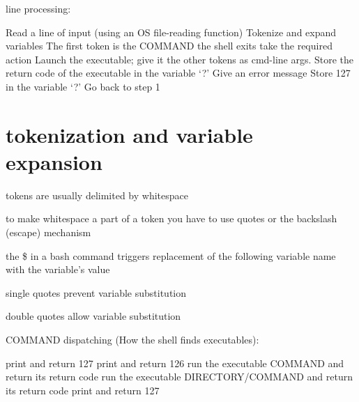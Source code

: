 \documentclass[landscape]{foils}
\begin{document}
\myNewSlide
\normalsize
{} line processing:
\begin{algorithmic}[1]
	\STATE Read a line of input (using an OS file-reading function)
	\STATE Tokenize and expand variables
	\STATE The first token is the COMMAND
	\STATE the  shell exits
	\STATE take the required action
	\ELSE 
		\STATE Launch the executable; give it the other tokens as cmd-line args.
		\STATE Store the return code of the executable in the variable `?'
	\ELSE
		\STATE Give an error message
		\STATE Store 127 in the variable `?'
	\ENDIF
	\ENDIF
	\STATE Go back to step 1
\end{algorithmic}

\myNewSlide
\section*{ tokenization and variable expansion}
\begin{compactenum}
	\item tokens are usually delimited by whitespace
	\item to make whitespace a part of a token you have to use quotes or the backslash (escape) mechanism
	\item the \$ in a bash command triggers replacement of the following variable name with the variable's value
	\item single quotes prevent variable substitution
	\item double quotes allow variable substitution
\end{compactenum}


\myNewSlide

 COMMAND  dispatching (How the shell finds executables):
\begin{algorithmic}[1]
			\STATE print  and return 127
			\STATE print  and return 126
		\ELSE
			\STATE run the executable COMMAND and return its return code
		\ENDIF
	\ELSE
				\STATE run the executable DIRECTORY/COMMAND and return its return code
			\ENDIF
		\ENDFOR
		\STATE print  and return 127
	\ENDIF
\end{algorithmic}
\end{document}
